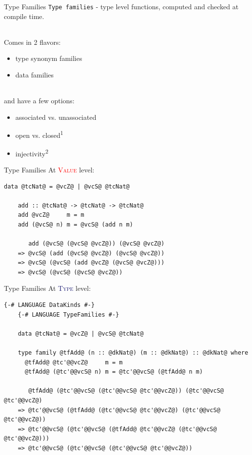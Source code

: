 \documentclass[xcolor={usenames,dvipsnames}]{beamer}
\newcommand{\htycon}[1]{\textcolor{MidnightBlue}{\textsc{#1}}}
\newcommand{\hvalcon}[1]{\textcolor{Red}{\textsc{#1}}}
\begin{document}
\begin{frame}[fragile]{Type Families}
  \texttt{Type families} - type level functions, computed and checked at compile time.

  \ \\
  Comes in 2 flavors:
  \begin{itemize}
    \item type synonym families
    \item data families
  \end{itemize}

  \ \\
  and have a few options:
  \begin{itemize}
    \item associated vs. unassociated
    \item open vs. closed\textsuperscript{1}
    \item injectivity\textsuperscript{2}
  \end{itemize}
\end{frame}

\begin{frame}[fragile]{Type Families}
  At \hvalcon{Value} level:
  \begin{lstlisting}[style=hask]
    data @tcNat@ = @vcZ@ | @vcS@ @tcNat@

    add :: @tcNat@ -> @tcNat@ -> @tcNat@
    add @vcZ@     m = m
    add (@vcS@ n) m = @vcS@ (add n m)

       add (@vcS@ (@vcS@ @vcZ@)) (@vcS@ @vcZ@)
    => @vcS@ (add (@vcS@ @vcZ@) (@vcS@ @vcZ@))
    => @vcS@ (@vcS@ (add @vcZ@ (@vcS@ @vcZ@)))
    => @vcS@ (@vcS@ (@vcS@ @vcZ@))
  \end{lstlisting}
\end{frame}

\begin{frame}[fragile]{Type Families}
  At \htycon{Type} level:
  \begin{lstlisting}[style=hask]
    {-# LANGUAGE DataKinds #-}
    {-# LANGUAGE TypeFamilies #-}

    data @tcNat@ = @vcZ@ | @vcS@ @tcNat@

    type family @tfAdd@ (n :: @dkNat@) (m :: @dkNat@) :: @dkNat@ where
      @tfAdd@ @tc'@@vcZ@     m = m
      @tfAdd@ (@tc'@@vcS@ n) m = @tc'@@vcS@ (@tfAdd@ n m)

       @tfAdd@ (@tc'@@vcS@ (@tc'@@vcS@ @tc'@@vcZ@)) (@tc'@@vcS@ @tc'@@vcZ@)
    => @tc'@@vcS@ (@tfAdd@ (@tc'@@vcS@ @tc'@@vcZ@) (@tc'@@vcS@ @tc'@@vcZ@))
    => @tc'@@vcS@ (@tc'@@vcS@ (@tfAdd@ @tc'@@vcZ@ (@tc'@@vcS@ @tc'@@vcZ@)))
    => @tc'@@vcS@ (@tc'@@vcS@ (@tc'@@vcS@ @tc'@@vcZ@))
  \end{lstlisting}
\end{frame}
\end{document}
